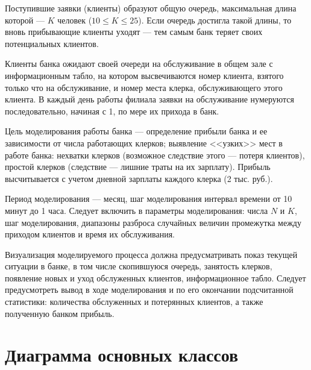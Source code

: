 \documentclass[oneside,final,12pt]{article}
\begin{document}
Поступившие заявки (клиенты) образуют общую очередь, максимальная длина которой --- $K$ человек ($10 \leq K \leq 25$). Если очередь достигла такой длины, то вновь прибывающие клиенты уходят --- тем самым банк теряет своих потенциальных клиентов.

Клиенты банка ожидают своей очереди на обслуживание в общем зале с информационным табло, на котором высвечиваются номер клиента, взятого только что на обслуживание, и номер места клерка, обслуживающего этого клиента. В каждый день работы филиала заявки на обслуживание нумеруются последовательно, начиная с 1, по мере их прихода в банк.

Цель моделирования работы банка --- определение прибыли банка и ее зависимости от числа работающих клерков; выявление <<узких>> мест в работе банка: нехватки клерков (возможное следствие этого --- потеря клиентов), простой клерков (следствие --- лишние траты на их зарплату). Прибыль высчитывается с учетом дневной зарплаты каждого клерка (2 тыс. руб.).

Период моделирования --- месяц, шаг моделирования интервал времени от 10 минут до 1 часа. Следует включить в параметры моделирования: числа $N$ и $K$, шаг моделирования, диапазоны разброса случайных величин промежутка между приходом клиентов и время их обслуживания.

Визуализация моделируемого процесса должна предусматривать показ текущей ситуации в банке, в том числе скопившуюся очередь, занятость клерков, появление новых и уход обслуженных клиентов, информационное табло. Следует предусмотреть вывод в ходе моделирования и по его окончании подсчитанной статистики: количества обслуженных и потерянных клиентов, а также полученную банком прибыль.

\newpage
\section{Диаграмма основных классов}
\end{document}
